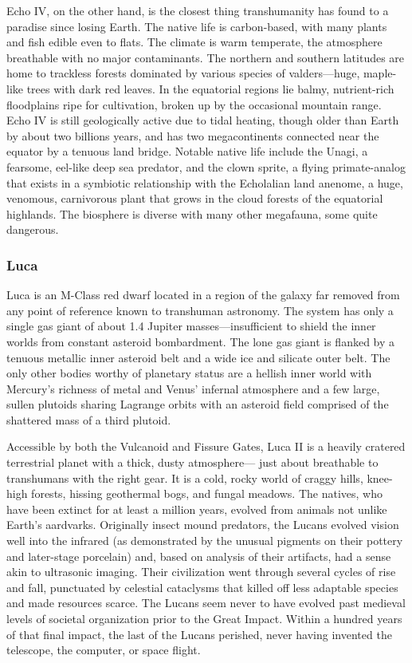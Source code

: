 Echo IV, on the other hand, is the closest thing transhumanity 
has found to a paradise since losing Earth. The native life is carbon-based, with many plants and fish edible even to flats. The climate is 
warm temperate, the atmosphere breathable with no major contaminants. The northern and southern latitudes are home to trackless 
forests dominated by various species of valders—huge, maple-like 
trees with dark red leaves. In the equatorial regions lie balmy, nutrient-rich floodplains ripe for cultivation, broken up by the occasional 
mountain range. Echo IV is still geologically active due to tidal heating, though older than Earth by about two billions years, and has 
two megacontinents connected near the equator by a tenuous land 
bridge. Notable native life include the Unagi, a fearsome, eel-like 
deep sea predator, and the clown sprite, a flying primate-analog that 
exists in a symbiotic relationship with the Echolalian land anenome, 
a huge, venomous, carnivorous plant that grows in the cloud forests 
of the equatorial highlands. The biosphere is diverse with many 
other megafauna, some quite dangerous.

\subsubsection{Luca}

Luca is an M-Class red dwarf located in a region of the galaxy 
far removed from any point of reference known to transhuman 
astronomy. The system has only a single gas giant of about 1.4 Jupiter masses—insufficient to shield the inner worlds from constant 
asteroid bombardment. The lone gas giant is flanked by a tenuous 
metallic inner asteroid belt and a wide ice and silicate outer belt. 
The only other bodies worthy of planetary status are a hellish inner 
world with Mercury's richness of metal and Venus' infernal atmosphere and a few large, sullen plutoids sharing Lagrange orbits with 
an asteroid field comprised of the shattered mass of a third plutoid.

Accessible by both the Vulcanoid and Fissure Gates, Luca II is a 
heavily cratered terrestrial planet with a thick, dusty atmosphere—
just about breathable to transhumans with the right gear. It is a cold, 
rocky world of craggy hills, knee-high forests, hissing geothermal 
bogs, and fungal meadows. The natives, who have been extinct for at 
least a million years, evolved from animals not unlike Earth's aardvarks. Originally insect mound predators, the Lucans evolved vision 
well into the infrared (as demonstrated by the unusual pigments on 
their pottery and later-stage porcelain) and, based on analysis of their 
artifacts, had a sense akin to ultrasonic imaging. Their civilization 
went through several cycles of rise and fall, punctuated by celestial 
cataclysms that killed off less adaptable species and made resources 
scarce. The Lucans seem never to have evolved past medieval levels 
of societal organization prior to the Great Impact. Within a hundred 
years of that final impact, the last of the Lucans perished, never 
having invented the telescope, the computer, or space flight.

